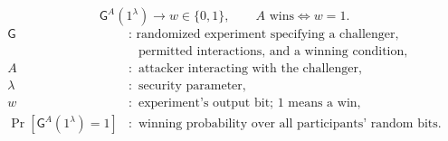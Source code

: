 \documentclass[12pt,a4paper]{article}
\begin{document}
\begin{samepage}
\begin{definition}
\[
\mathsf{G}^{A}(1^\lambda)\longrightarrow w\in\{0,1\},
\qquad A\text{ wins}\iff w=1.
\]
\[
\begin{aligned}
\mathsf{G}&:\text{ randomized experiment specifying a challenger,}\\
&\phantom{:}\text{ permitted interactions, and a winning condition},\\
A&:\text{ attacker interacting with the challenger},\\
\lambda&:\text{ security parameter},\\
w&:\text{ experiment's output bit; }1\text{ means a win},\\
\Pr[\mathsf{G}^{A}(1^\lambda)=1]&:\text{ winning probability over all participants' random bits}.
\end{aligned}
\]
\end{definition}

\end{samepage}
\end{document}
